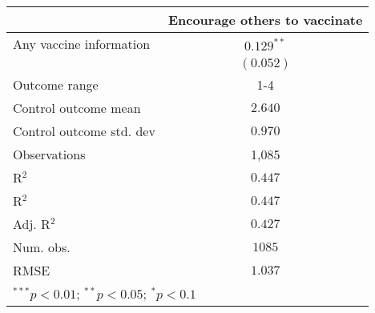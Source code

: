 
\begin{table}
\begin{center}
\begin{tabular}{l c}
\hline
 & Encourage others to vaccinate \\
\hline
Any vaccine information  & $0.129^{**}$ \\
                         & $(0.052)$    \\
\hline
Outcome range            & 1-4          \\
Control outcome mean     & $2.640$      \\
Control outcome std. dev & $0.970$      \\
Observations             & 1,085        \\
R$^{2}$                  & $0.447$      \\
R$^2$                    & $0.447$      \\
Adj. R$^2$               & $0.427$      \\
Num. obs.                & $1085$       \\
RMSE                     & $1.037$      \\
\hline
\multicolumn{2}{l}{\scriptsize{$^{***}p<0.01$; $^{**}p<0.05$; $^{*}p<0.1$}}
\end{tabular}
\caption{}
\label{table:Tables and Figures/SI_table21_anyinfo_Colombia_encourage1-4}
\end{center}
\end{table}
